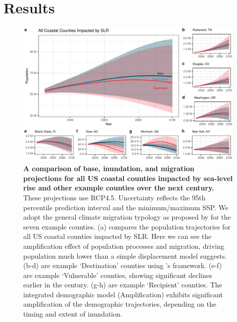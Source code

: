 \documentclass[12pt]{article}
\begin{document}
\hypertarget{results}{%
\section{Results}\label{results}}

\newcommand{\Overall}{8.6M - 28M [5.7M - 53M]} 
\newcommand{\OverallMig}{0.4M - 10M}
\newcommand{\OverallMigShort}{1.4M}
\newcommand{\Multiplier}{5.3 to 18}
\newcommand{\MiamiAmp}{243.9K [72.9K - 1.1M]}
\newcommand{\MiamiDisp}{28.3K [4.4K - 204.2K]}
\newcommand{\DareAmp}{39.8K [14.6K - 70.0K]}
\newcommand{\DareDisp}{8.5K [1.5K - 22.9K]}
\newcommand{\RutherfordAmp}{245.1K [78.5K - 852.3K]}
\newcommand{\RutherfordDisp}{34.9K [8.2K - 197.5K]}
\newcommand{\DouglasAmp}{377.7K [117.8K - 1.6M]}
\newcommand{\DouglasDisp}{32.3K [5.2K - 230.3K]}
\newcommand{\WashingtonAmp}{131.9K [50.9K - 377.8K]}
\newcommand{\WashingtonDisp}{12.9K [3.8K - 55.1K]}
\newcommand{\StuckEarly}{2.5K [2.3K - 2.9K]}
\newcommand{\StuckEnd}{208K [103K - 500K]}

\begin{figure}
\includegraphics[width=1\linewidth]{FigProjLines2_uncertainty} \caption{\textbf{A comparison of base, inundation, and migration projections for all US coastal counties impacted by sea-level rise and other example counties over the next century.} These projections use RCP4.5. Uncertainty reflects the 95th percentile prediction interval and the minimum/maximum SSP. We adopt the general climate migration typology as proposed by \citep{marandi2021vulnerable} for the seven example counties. (a) compares the population trajectories for all US coastal counties impacted by SLR. Here we can see the amplification effect of population processes and migration, driving population much lower than a simple displacement model suggests. (b-d) are example `Destination' counties using \citep{marandi2021vulnerable}'s framework. (e-f) are example `Vulnerable' counties, showing significant declines earlier in the century. (g-h) are example `Recipient' counties. The integrated demographic model (Amplification) exhibits significant amplification of the demographic trajectories, depending on the timing and extent of inundation. \label{fig:Lines}}\label{fig:mainfig}
\end{figure}
\end{document}
